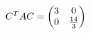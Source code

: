 \documentclass[preview]{standalone}
\begin{document}
\begin{align*}
\special{dvisvgm:raw <g id='unique000'>}C^TAC=\begin{pmatrix}3&0\\0&\frac{14}{3}\end{pmatrix}\special{dvisvgm:raw </g>}
\end{align*}
\end{document}
